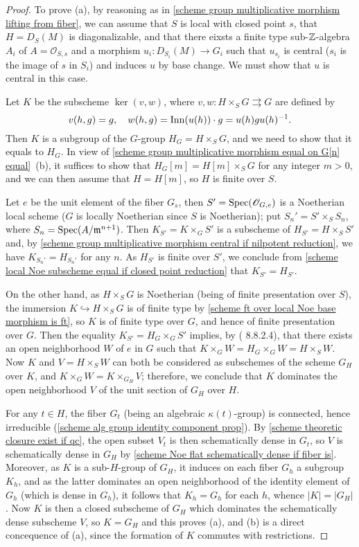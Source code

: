 \begin{proof}
To prove (a), by reasoning as in \cref{scheme group multiplicative morphism lifting from fiber}, we can assume that $S$ is local with closed point $s$, that $H=D_S(M)$ is diagonalizable, and that there eixsts a finite type sub-$\mathbb{Z}$-algebra $A_i$ of $A=\mathscr{O}_{S,s}$ and a morphism $u_i:D_{S_i}(M)\to G_i$ such that $u_{s_i}$ is central ($s_i$ is the image of $s$ in $S_i$) and induces $u$ by base change. We must show that $u$ is central in this case.\par
Let $K$ be the subscheme $\ker(v,w)$, where $v,w:H\times_SG\rightrightarrows G$ are defined by
\[v(h,g)=g,\quad w(h,g)=\mathrm{Inn}(u(h))\cdot g=u(h)gu(h)^{-1}.\]
Then $K$ is a subgroup of the $G$-group $H_G=H\times_SG$, and we need to show that it equals to $H_G$. In view of \cref{scheme group multiplicative morphism equal on G[n] equal}~(b), it suffices to show that $H_G[m]=H[m]\times_SG$ for any integer $m>0$, and we can then assume that $H=H[m]$, so $H$ is finite over $S$.\par
Let $e$ be the unit element of the fiber $G_s$, then $S'=\mathrm{Spec}(\mathscr{O}_{G,e})$ is a Noetherian local scheme ($G$ is locally Noetherian since $S$ is Noetherian); put $S_n'=S'\times_SS_n$, where $S_n=\mathrm{Spec}(A/\mathfrak{m}^{n+1})$. Then $K_{S'}=K\times_GS'$ is a subscheme of $H_{S'}=H\times_SS'$ and, by \cref{scheme group multiplicative morphism central if nilpotent reduction}, we have $K_{S_n'}=H_{S_n'}$ for any $n$. As $H_{S'}$ is finite over $S'$, we conclude from \cref{scheme local Noe subscheme equal if closed point reduction} that $K_{S'}=H_{S'}$.\par
On the other hand, as $H\times_SG$ is Noetherian (being of finite presentation over $S$), the immersion $K\hookrightarrow H\times_SG$ is of finite type by \cref{scheme ft over local Noe base morphism is ft}, so $K$ is of finite type over $G$, and hence of finite presentation over $G$. Then the equality $K_{S'}=H_G\times_GS'$ implies, by (\cite{EGA4-3} 8.8.2.4), that there exists an open neighborhood $W$ of $e$ in $G$ such that $K\times_GW=H_G\times_GW=H\times_SW$. Now $K$ and $V=H\times_SW$ can both be considered as subschemes of the scheme $G_H$ over $K$, and $K\times_GW=K\times_{G_H}V$; therefore, we conclude that $K$ dominates the open neighborhood $V$ of the unit section of $G_H$ over $H$.\par
For any $t\in H$, the fiber $G_t$ (being an algebraic $\kappa(t)$-group) is connected, hence irreducible (\cref{scheme alg group identity component prop}). By \cref{scheme theoretic closure exist if qc}, the open subset $V_t$ is then schematically dense in $G_t$, so $V$ is schematically dense in $G_H$ by \cref{scheme Noe flat schematically dense if fiber is}. Moreover, as $K$ is a sub-$H$-group of $G_H$, it induces on each fiber $G_h$ a subgroup $K_h$, and as the latter dominates an open neighborhood of the identity element of $G_h$ (which is dense in $G_h$), it follows that $K_h=G_h$ for each $h$, whence $|K|=|G_H|$. Now $K$ is then a closed subscheme of $G_H$ which dominates the schematically dense subscheme $V$, so $K=G_H$ and this proves (a), and (b) is a direct concequence of (a), since the formation of $K$ commutes with restrictions.
\end{proof}

